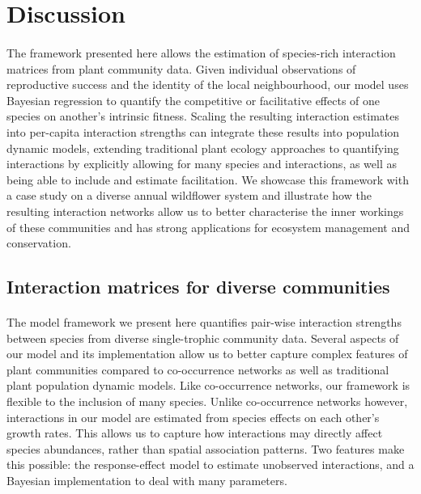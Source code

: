\documentclass[a4,12pt]{article}
\begin{document}
\section{Discussion}
    
    \paragraph{}
    The framework presented here allows the estimation of species-rich interaction matrices from plant community data. Given individual observations of reproductive success and the identity of the local neighbourhood, our model uses Bayesian regression to quantify the competitive or facilitative effects of one species on another's intrinsic fitness. Scaling the resulting interaction estimates into per-capita interaction strengths can integrate these results into  population dynamic models, extending traditional plant ecology approaches to quantifying interactions by explicitly allowing for many species and interactions, as well as being able to include and estimate facilitation. We showcase this framework with a case study on a diverse annual wildflower system and illustrate how the resulting interaction networks allow us to better characterise the inner workings of these communities and has strong applications for ecosystem management and conservation.

    \subsection{Interaction matrices for diverse communities}

    \paragraph{}
    The model framework we present here quantifies pair-wise interaction strengths between species from diverse single-trophic community data. Several aspects of our model and its implementation allow us to better capture complex features of plant communities compared to co-occurrence networks as well as traditional plant population dynamic models. Like co-occurrence networks, our framework is flexible to the inclusion of many species. Unlike co-occurrence networks however, interactions in our model are estimated from species effects on each other's growth rates. This allows us to capture how interactions may directly affect species abundances, rather than spatial association patterns. Two features make this possible: the response-effect model to estimate unobserved interactions, and a Bayesian implementation to deal with many parameters. 
\end{document}
